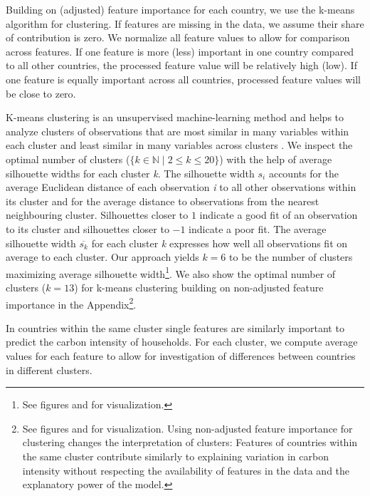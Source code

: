 \documentclass[12pt, a4paper]{article}
\begin{document}
Building on (adjusted) feature importance for each country, we use the k-means algorithm for clustering. If features are missing in the data, we assume their share of contribution is zero. We normalize all feature values to allow for comparison across features. If one feature is more (less) important in one country compared to all other countries, the processed feature value will be relatively high (low). If one feature is equally important across all countries, processed feature values will be close to zero.

K-means clustering is an unsupervised machine-learning method and helps to analyze clusters of observations that are most similar in many variables within each cluster and least similar in many variables across clusters \autocite{MacQueen.1967}. We inspect the optimal number of clusters ($\{k \in \mathbb{N} \mid 2  \leq k \leq 20 \}$) with the help of average silhouette widths \autocite{Rousseeuw.1987} for each cluster \textit{k}. The silhouette width $s_{i}$ accounts for the average Euclidean distance of each observation \textit{i} to all other observations within its cluster and for the average distance to observations from the nearest neighbouring cluster. Silhouettes closer to $1$ indicate a good fit of an observation to its cluster and silhouettes closer to $-1$ indicate a poor fit. The average silhouette width $\overline{s_{k}}$ for each cluster \textit{k} expresses how well all observations fit on average to each cluster. Our approach yields $k = 6$ to be the number of clusters maximizing average silhouette width\footnote{See figures  and  for visualization.}. We also show the optimal number of clusters ($k = 13$) for k-means clustering building on non-adjusted feature importance in the Appendix\footnote{See figures  and  for visualization. Using non-adjusted feature importance for clustering changes the interpretation of clusters: Features of countries within the same cluster contribute similarly to explaining variation in carbon intensity without respecting the availability of features in the data and the explanatory power of the model.}.

In countries within the same cluster single features are similarly important to predict the carbon intensity of households. For each cluster, we compute average values for each feature to allow for investigation of differences between countries in different clusters.%
\end{document}
